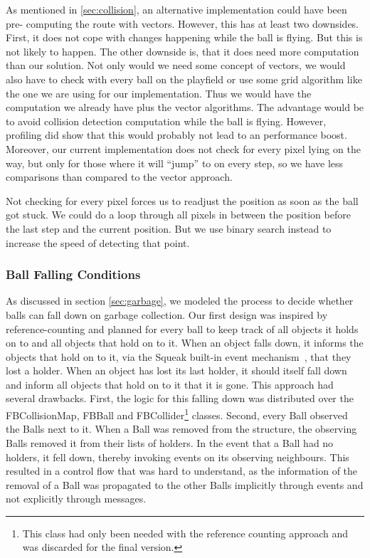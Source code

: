 As mentioned in \ref{sec:collision}, an alternative implementation could have been pre- computing the route
with vectors. However, this has at least two downsides. First, it does not cope with changes happening
while the ball is flying. But this is not likely to happen. The other downside is, that it does need more
computation than our solution. Not only would we need some concept of vectors, we would also have to check
with every ball on the playfield or use some grid algorithm like the one we are using for our implementation.
Thus we would have the computation we already have plus the vector algorithms. The advantage would be to avoid
collision detection computation while the ball is flying. However, profiling did show that this would probably
not lead to an performance boost. Moreover, our current implementation does not check for every pixel lying
on the way, but only for those where it will ``jump'' to on every step, so we have less comparisons than compared
to the vector approach.

Not checking for every pixel forces us to readjust the position as soon as the ball got stuck. We could do a loop
through all pixels in between the position before the last step and the current position. But we use binary search
instead to increase the speed of detecting that point.
%
\subsubsection{Ball Falling Conditions}
As discussed in section \ref{sec:garbage}, we modeled the process to decide whether balls can fall down on garbage collection. Our first design was inspired by reference-counting and planned for every ball to keep track of all objects it holds on to and all objects that hold on to it. When an object falls down, it informs the objects that hold on to it, via the Squeak built-in event mechanism~\cite{website:squeakwikiObserver}, that they lost a holder. When an object has lost its last holder, it should itself fall down and inform all objects that hold on to it that it is gone.
This approach had several drawbacks. First, the logic for this falling down was distributed over the FBCollisionMap, FBBall and FBCollider\footnote{This class had only been needed with the reference counting approach and was discarded for the final version.} classes.
Second, every Ball observed the Balls next to it. When a Ball was removed from the structure, the observing Balls removed it from their lists of holders. In the event that a Ball had no holders, it fell down, thereby invoking events on its observing neighbours.
This resulted in a control flow that was hard to understand, as the information of the removal of a Ball was propagated to the other Balls implicitly through events and not explicitly through messages.

